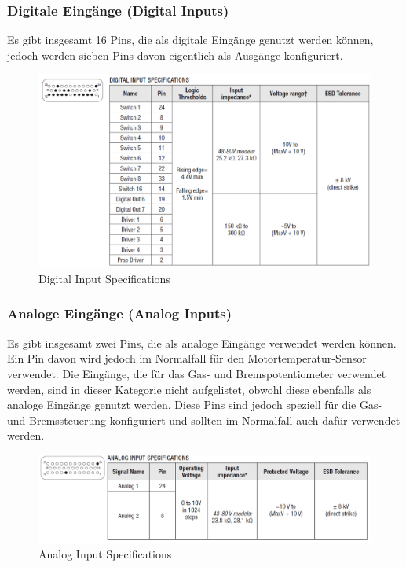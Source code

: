 \subsubsection{Digitale Eingänge (Digital Inputs)}
Es gibt insgesamt 16 Pins, die als digitale Eingänge genutzt werden können, jedoch werden sieben Pins davon eigentlich als Ausgänge konfiguriert. 

\begin{figure}[H]
	\begin{center}
		\includegraphics[width=\textwidth]{figures/antrieb/Digital_Input_Specifications.png}
		\caption{Digital Input Specifications}
	\end{center}
\end{figure}




\subsubsection{Analoge Eingänge (Analog Inputs)}
Es gibt insgesamt zwei Pins, die als analoge Eingänge verwendet werden können. Ein Pin davon wird jedoch im Normalfall für den Motortemperatur-Sensor verwendet. Die Eingänge, die für das Gas- und Bremspotentiometer verwendet werden, sind in dieser Kategorie nicht aufgelistet, obwohl diese ebenfalls als analoge Eingänge genutzt werden. Diese Pins sind jedoch speziell für die Gas- und Bremssteuerung konfiguriert und sollten im Normalfall auch dafür verwendet werden.

\begin{figure}[H]
	\begin{center}
		\includegraphics[width=\textwidth]{figures/antrieb/Analog_Input_Specifications.png}
		\caption{Analog Input Specifications}
	\end{center}
\end{figure}



